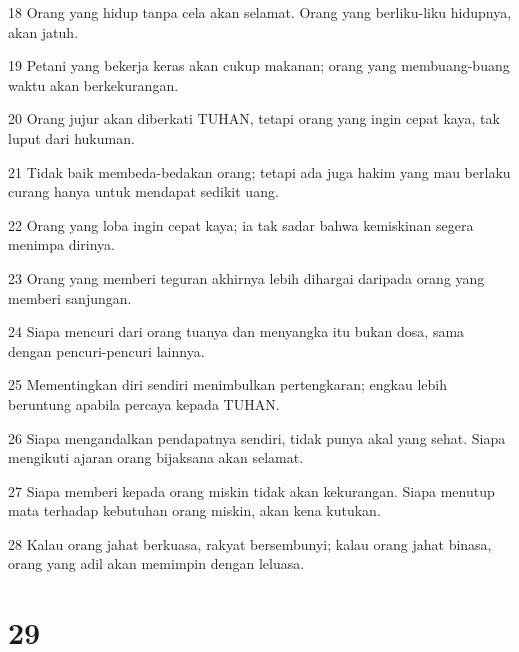 \par 18 Orang yang hidup tanpa cela akan selamat. Orang yang berliku-liku hidupnya, akan jatuh.
\par 19 Petani yang bekerja keras akan cukup makanan; orang yang membuang-buang waktu akan berkekurangan.
\par 20 Orang jujur akan diberkati TUHAN, tetapi orang yang ingin cepat kaya, tak luput dari hukuman.
\par 21 Tidak baik membeda-bedakan orang; tetapi ada juga hakim yang mau berlaku curang hanya untuk mendapat sedikit uang.
\par 22 Orang yang loba ingin cepat kaya; ia tak sadar bahwa kemiskinan segera menimpa dirinya.
\par 23 Orang yang memberi teguran akhirnya lebih dihargai daripada orang yang memberi sanjungan.
\par 24 Siapa mencuri dari orang tuanya dan menyangka itu bukan dosa, sama dengan pencuri-pencuri lainnya.
\par 25 Mementingkan diri sendiri menimbulkan pertengkaran; engkau lebih beruntung apabila percaya kepada TUHAN.
\par 26 Siapa mengandalkan pendapatnya sendiri, tidak punya akal yang sehat. Siapa mengikuti ajaran orang bijaksana akan selamat.
\par 27 Siapa memberi kepada orang miskin tidak akan kekurangan. Siapa menutup mata terhadap kebutuhan orang miskin, akan kena kutukan.
\par 28 Kalau orang jahat berkuasa, rakyat bersembunyi; kalau orang jahat binasa, orang yang adil akan memimpin dengan leluasa.

\chapter{29}

